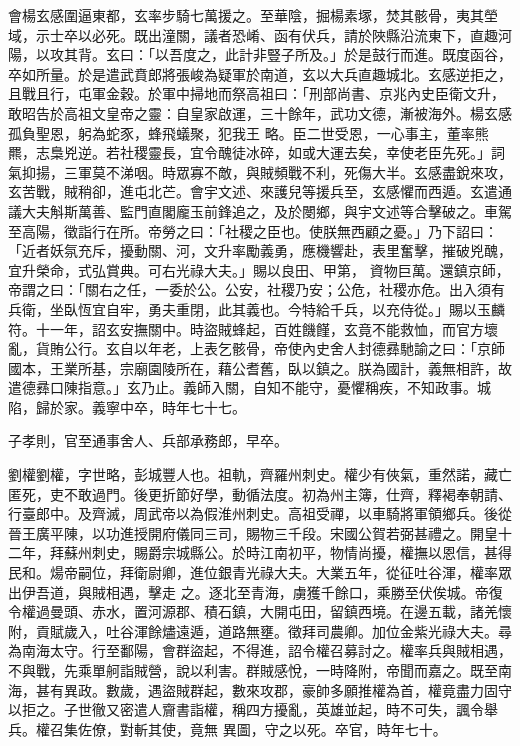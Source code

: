 \begin{pinyinscope}
 會楊玄感圍逼東都，玄率步騎七萬援之。至華陰，掘楊素塚，焚其骸骨，夷其塋域，示士卒以必死。既出潼關，議者恐崤、函有伏兵，請於陜縣沿流東下，直趣河陽，以攻其背。玄曰：「以吾度之，此計非豎子所及。」於是鼓行而進。既度函谷，卒如所量。於是遣武賁郎將張峻為疑軍於南道，玄以大兵直趣城北。玄感逆拒之，且戰且行，屯軍金穀。於軍中掃地而祭高祖曰：「刑部尚書、京兆內史臣衛文升，敢昭告於高祖文皇帝之靈：自皇家啟運，三十餘年，武功文德，漸被海外。楊玄感孤負聖恩，躬為蛇豕，蜂飛蟻聚，犯我王
 略。臣二世受恩，一心事主，董率熊羆，志梟兇逆。若社稷靈長，宜令醜徒冰碎，如或大運去矣，幸使老臣先死。」詞氣抑揚，三軍莫不涕咽。時眾寡不敵，與賊頻戰不利，死傷大半。玄感盡銳來攻，玄苦戰，賊稍卻，進屯北芒。會宇文述、來護兒等援兵至，玄感懼而西遁。玄遣通議大夫斛斯萬善、監門直閣龐玉前鋒追之，及於閿鄉，與宇文述等合擊破之。車駕至高陽，徵詣行在所。帝勞之曰：「社稷之臣也。使朕無西顧之憂。」乃下詔曰：「近者妖氛充斥，擾動關、河，文升率勵義勇，應機響赴，表里奮擊，摧破兇醜，宜升榮命，式弘賞典。可右光祿大夫。」賜以良田、甲第，
 資物巨萬。還鎮京師，帝謂之曰：「關右之任，一委於公。公安，社稷乃安；公危，社稷亦危。出入須有兵衛，坐臥恆宜自牢，勇夫重閉，此其義也。今特給千兵，以充侍從。」賜以玉麟符。十一年，詔玄安撫關中。時盜賊蜂起，百姓饑饉，玄竟不能救恤，而官方壞亂，貨賄公行。玄自以年老，上表乞骸骨，帝使內史舍人封德彞馳諭之曰：「京師國本，王業所基，宗廟園陵所在，藉公耆舊，臥以鎮之。朕為國計，義無相許，故遣德彞口陳指意。」玄乃止。義師入關，自知不能守，憂懼稱疾，不知政事。城陷，歸於家。義寧中卒，時年七十七。



 子孝則，官至通事舍人、兵部承務郎，早卒。



 劉權劉權，字世略，彭城豐人也。祖軌，齊羅州刺史。權少有俠氣，重然諾，藏亡匿死，吏不敢過門。後更折節好學，動循法度。初為州主簿，仕齊，釋褐奉朝請、行臺郎中。及齊滅，周武帝以為假淮州刺史。高祖受禪，以車騎將軍領鄉兵。後從晉王廣平陳，以功進授開府儀同三司，賜物三千段。宋國公賀若弼甚禮之。開皇十二年，拜蘇州刺史，賜爵宗城縣公。於時江南初平，物情尚擾，權撫以恩信，甚得民和。煬帝嗣位，拜衛尉卿，進位銀青光祿大夫。大業五年，從征吐谷渾，權率眾出伊吾道，與賊相遇，擊走
 之。逐北至青海，虜獲千餘口，乘勝至伏俟城。帝復令權過曼頭、赤水，置河源郡、積石鎮，大開屯田，留鎮西境。在邊五載，諸羌懷附，貢賦歲入，吐谷渾餘燼遠遁，道路無壅。徵拜司農卿。加位金紫光祿大夫。尋為南海太守。行至鄱陽，會群盜起，不得進，詔令權召募討之。權率兵與賊相遇，不與戰，先乘單舸詣賊營，說以利害。群賊感悅，一時降附，帝聞而嘉之。既至南海，甚有異政。數歲，遇盜賊群起，數來攻郡，豪帥多願推權為首，權竟盡力固守以拒之。子世徹又密遣人齎書詣權，稱四方擾亂，英雄並起，時不可失，諷令舉兵。權召集佐僚，對斬其使，竟無
 異圖，守之以死。卒官，時年七十。




\end{pinyinscope}
